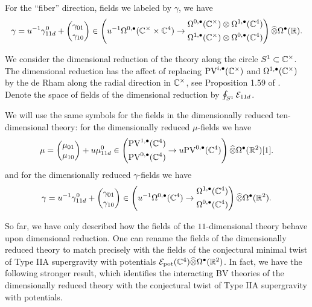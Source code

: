 \documentclass[11pt]{article}
\newcommand\bu{\bullet}
\def\Hat{\widehat}
\begin{document}
For the ``fiber'' direction, fields we labeled by $\gamma$, we have
\[
\gamma = u^{-1} \gamma_{11d}^0 + \begin{pmatrix} \gamma_{01} \\ \gamma_{10} \end{pmatrix} \in \left (u^{-1} \Omega^{0,\bullet}(\C^\times\times\C^4) \to \begin{aligned} & \Omega^{0,\bullet}(\C^\times)\otimes\Omega^{1,\bullet}(\C^4)\\ & \Omega^{1,\bullet}(\C^\times)\otimes\Omega^{0,\bullet}(\C^4)\end{aligned} \right ) \Hat{\otimes} \Omega^\bullet(\R).
\]

We consider the dimensional reduction of the theory along the circle $S^1 \subset \mathbb{C}^\times$.
The dimensional reduction has the affect of replacing $\PV^{i,\bu}(\mb C^\times)$ and $\Omega^{1,\bu}(\mb C^\times)$ by the de Rham along the radial direction in $\mathbb{C}^\times$, see Proposition 1.59 of \cite{ESW}. 
Denote the space of fields of the dimensional reduction by $\oint_{S^1} \mathcal{E}_{11d}$. 

We will use the same symbols for the fields in the dimensionally reduced ten-dimensional theory: for the dimensionally reduced $\mu$-fields we have
\[
\mu = \begin{pmatrix} \mu_{01} \\ \mu_{10} \end{pmatrix} + u \mu_{11d}^0 \in \left (\begin{aligned} & \PV^{1,\bullet}(\C^4) \\ & \PV^{0,\bullet}(\C^4)\end{aligned} \to u \PV^{0,\bullet}(\C^4)\right ) \Hat{\otimes} \Omega^\bullet(\R^2) [1] .
\]
and for the dimensionally reduced $\gamma$-fields we have
\[
\gamma = u^{-1} \gamma_{11d}^0 + \begin{pmatrix} \gamma_{01} \\ \gamma_{10} \end{pmatrix} \in \left (u^{-1} \Omega^{0,\bullet}(\C^4) \to \begin{aligned} & \Omega^{1,\bullet}(\C^4)\\ & \Omega^{0,\bullet}(\C^4)\end{aligned} \right ) \Hat{\otimes} \Omega^\bullet(\R^2).
\]

So far, we have only described how the fields of the $11$-dimensional theory behave upon dimensional reduction. 
One can rename the fields of the dimensionally reduced theory to match precisely with the fields of the conjectural minimal twist of  Type IIA supergravity with potentials $\mc E_{\rm pot}(\mb C^4) \Hat{\otimes} \Omega^\bu(\mb R^2)$. 
In fact, we have the following stronger result, which identifies the interacting BV theories of the dimensionally reduced theory with the conjectural twist of Type IIA supergravity with potentials. 
\end{document}
